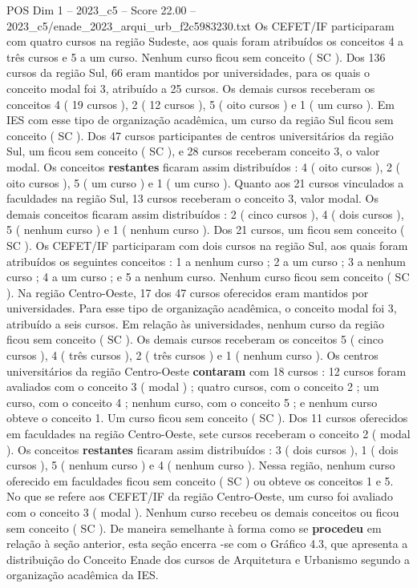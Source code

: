 \begin{textsample}{POS Dim 1 – 2023\_c5 – Score 22.00 – 2023\_c5/enade\_2023\_arqui\_urb\_f2c5983230.txt}
Os CEFET/IF participaram com quatro cursos na região Sudeste, aos quais foram atribuídos os conceitos 4 a três cursos e 5 a um curso.
Nenhum curso ficou sem conceito ( SC ).
Dos 136 cursos da região Sul, 66 eram mantidos por universidades, para os quais o conceito modal foi 3, atribuído a 25 cursos.
Os demais cursos receberam os conceitos 4 ( 19 cursos ), 2 ( 12 cursos ), 5 ( oito cursos ) e 1 ( um curso ).
Em IES com esse tipo de organização acadêmica, um curso da região Sul ficou sem conceito ( SC ).
Dos 47 cursos participantes de centros universitários da região Sul, um ficou sem conceito ( SC ), e 28 cursos receberam conceito 3, o valor modal.
Os conceitos \textbf{restantes} ficaram assim distribuídos : 4 ( oito cursos ), 2 ( oito cursos ), 5 ( um curso ) e 1 ( um curso ).
Quanto aos 21 cursos vinculados a faculdades na região Sul, 13 cursos receberam o conceito 3, valor modal.
Os demais conceitos ficaram assim distribuídos : 2 ( cinco cursos ), 4 ( dois cursos ), 5 ( nenhum curso ) e 1 ( nenhum curso ).
Dos 21 cursos, um ficou sem conceito ( SC ).
Os CEFET/IF participaram com dois cursos na região Sul, aos quais foram atribuídos os seguintes conceitos : 1 a nenhum curso ; 2 a um curso ; 3 a nenhum curso ; 4 a um curso ; e 5 a nenhum curso.
Nenhum curso ficou sem conceito ( SC ).
Na região Centro-Oeste, 17 dos 47 cursos oferecidos eram mantidos por universidades.
Para esse tipo de organização acadêmica, o conceito modal foi 3, atribuído a seis cursos.
Em relação às universidades, nenhum curso da região ficou sem conceito ( SC ).
Os demais cursos receberam os conceitos 5 ( cinco cursos ), 4 ( três cursos ), 2 ( três cursos ) e 1 ( nenhum curso ).
Os centros universitários da região Centro-Oeste \textbf{contaram} com 18 cursos : 12 cursos foram avaliados com o conceito 3 ( modal ) ; quatro cursos, com o conceito 2 ; um curso, com o conceito 4 ; nenhum curso, com o conceito 5 ; e nenhum curso obteve o conceito 1.
Um curso ficou sem conceito ( SC ).
Dos 11 cursos oferecidos em faculdades na região Centro-Oeste, sete cursos receberam o conceito 2 ( modal ).
Os conceitos \textbf{restantes} ficaram assim distribuídos : 3 ( dois cursos ), 1 ( dois cursos ), 5 ( nenhum curso ) e 4 ( nenhum curso ).
Nessa região, nenhum curso oferecido em faculdades ficou sem conceito ( SC ) ou obteve os conceitos 1 e 5.
No que se refere aos CEFET/IF da região Centro-Oeste, um curso foi avaliado com o conceito 3 ( modal ).
Nenhum curso recebeu os demais conceitos ou ficou sem conceito ( SC ).
De maneira semelhante à forma como se \textbf{procedeu} em relação à seção anterior, esta seção encerra -se com o Gráfico 4.3, que apresenta a distribuição do Conceito Enade dos cursos de Arquitetura e Urbanismo segundo a organização acadêmica da IES.

\end{textsample}
